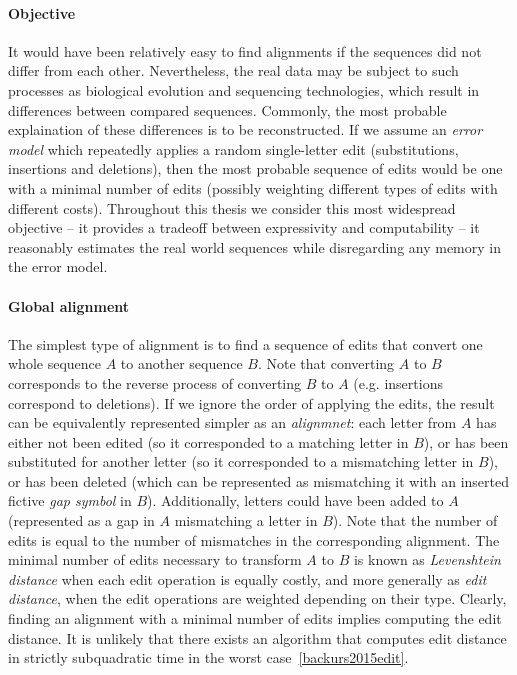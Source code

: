 \paragraph{Objective}
It would have been relatively easy to find alignments if the sequences did not
differ from each other. Nevertheless, the real data may be subject to such
processes as biological evolution and sequencing technologies, which result in
differences between compared sequences. Commonly, the most probable explaination
of these differences is to be reconstructed. If we assume an \emph{error model}
which repeatedly applies a random single-letter edit (substitutions, insertions
and deletions), then the most probable sequence of edits would be one with a
minimal number of edits (possibly weighting different types of edits with
different costs). Throughout this thesis we consider this most widespread
objective -- it provides a tradeoff between expressivity and computability -- it
reasonably estimates the real world sequences while disregarding any memory in
the error model.

\paragraph{Global alignment}
The simplest type of alignment is to find a sequence of edits that convert one
whole sequence $A$ to another sequence $B$. Note that converting $A$ to $B$
corresponds to the reverse process of converting $B$ to $A$ (e.g. insertions
correspond to deletions). If we ignore the order of applying the edits, the
result can be equivalently represented simpler as an \emph{alignmnet}: each
letter from $A$ has either not been edited (so it corresponded to a matching
letter in $B$), or has been substituted for another letter (so it corresponded
to a mismatching letter in $B$), or has been deleted (which can be represented
as mismatching it with an inserted fictive \emph{gap symbol} in $B$).
Additionally, letters could have been added to $A$ (represented as a gap in $A$
mismatching a letter in $B$). Note that the number of edits is equal to the
number of mismatches in the corresponding alignment. The minimal number of edits
necessary to transform $A$ to $B$ is known as \emph{Levenshtein distance} when
each edit operation is equally costly, and more generally as \emph{edit
distance}, when the edit operations are weighted depending on their type.
Clearly, finding an alignment with a minimal number of edits implies computing
the edit distance. It is unlikely that there exists an algorithm that computes
edit distance in strictly subquadratic time in the worst
case~\cref{backurs2015edit}.

